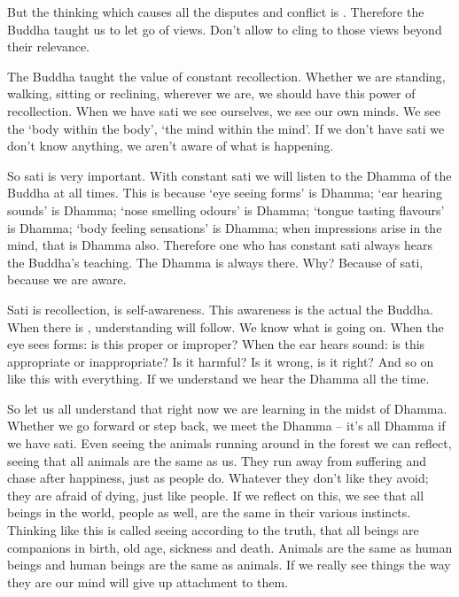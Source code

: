 But the thinking which causes all the disputes and conflict is . Therefore the Buddha taught us to let go of views. Don't allow  to cling to those views beyond their relevance.

The Buddha taught the value of constant  recollection. Whether we are standing, walking, sitting or reclining, wherever we are, we should have this power of recollection. When we have sati we see ourselves, we see our own minds. We see the `body within the body', `the mind within the mind'. If we don't have sati we don't know anything, we aren't aware of what is happening.

So sati is very important. With constant sati we will listen to the Dhamma of the Buddha at all times. This is because `eye seeing forms' is Dhamma; `ear hearing sounds' is Dhamma; `nose smelling odours' is Dhamma; `tongue tasting flavours' is Dhamma; `body feeling sensations' is Dhamma; when impressions arise in the mind, that is Dhamma also. Therefore one who has constant sati always hears the Buddha's teaching. The Dhamma is always there. Why? Because of sati, because we are aware.

Sati is recollection,  is self-awareness. This awareness is the actual  the Buddha. When there is , understanding will follow. We know what is going on. When the eye sees forms: is this proper or improper? When the ear hears sound: is this appropriate or inappropriate? Is it harmful? Is it wrong, is it right? And so on like this with everything. If we understand we hear the Dhamma all the time.

So let us all understand that right now we are learning in the midst of Dhamma. Whether we go forward or step back, we meet the Dhamma -- it's all Dhamma if we have sati. Even seeing the animals running around in the forest we can reflect, seeing that all animals are the same as us. They run away from suffering and chase after happiness, just as people do. Whatever they don't like they avoid; they are afraid of dying, just like people. If we reflect on this, we see that all beings in the world, people as well, are the same in their various instincts. Thinking like this is called  seeing according to the truth, that all beings are companions in birth, old age, sickness and death. Animals are the same as human beings and human beings are the same as animals. If we really see things the way they are our mind will give up attachment to them.

